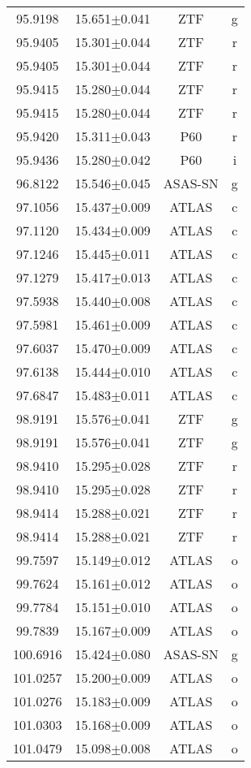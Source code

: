 \begin{table}
\begin{tabular}{cccc}
95.9198 & 15.651$\pm$0.041 & ZTF & g \\
95.9405 & 15.301$\pm$0.044 & ZTF & r \\
95.9405 & 15.301$\pm$0.044 & ZTF & r \\
95.9415 & 15.280$\pm$0.044 & ZTF & r \\
95.9415 & 15.280$\pm$0.044 & ZTF & r \\
95.9420 & 15.311$\pm$0.043 & P60 & r \\
95.9436 & 15.280$\pm$0.042 & P60 & i \\
96.8122 & 15.546$\pm$0.045 & ASAS-SN & g \\
97.1056 & 15.437$\pm$0.009 & ATLAS & c \\
97.1120 & 15.434$\pm$0.009 & ATLAS & c \\
97.1246 & 15.445$\pm$0.011 & ATLAS & c \\
97.1279 & 15.417$\pm$0.013 & ATLAS & c \\
97.5938 & 15.440$\pm$0.008 & ATLAS & c \\
97.5981 & 15.461$\pm$0.009 & ATLAS & c \\
97.6037 & 15.470$\pm$0.009 & ATLAS & c \\
97.6138 & 15.444$\pm$0.010 & ATLAS & c \\
97.6847 & 15.483$\pm$0.011 & ATLAS & c \\
98.9191 & 15.576$\pm$0.041 & ZTF & g \\
98.9191 & 15.576$\pm$0.041 & ZTF & g \\
98.9410 & 15.295$\pm$0.028 & ZTF & r \\
98.9410 & 15.295$\pm$0.028 & ZTF & r \\
98.9414 & 15.288$\pm$0.021 & ZTF & r \\
98.9414 & 15.288$\pm$0.021 & ZTF & r \\
99.7597 & 15.149$\pm$0.012 & ATLAS & o \\
99.7624 & 15.161$\pm$0.012 & ATLAS & o \\
99.7784 & 15.151$\pm$0.010 & ATLAS & o \\
99.7839 & 15.167$\pm$0.009 & ATLAS & o \\
100.6916 & 15.424$\pm$0.080 & ASAS-SN & g \\
101.0257 & 15.200$\pm$0.009 & ATLAS & o \\
101.0276 & 15.183$\pm$0.009 & ATLAS & o \\
101.0303 & 15.168$\pm$0.009 & ATLAS & o \\
101.0479 & 15.098$\pm$0.008 & ATLAS & o \\

\end{tabular}
\end{table}
